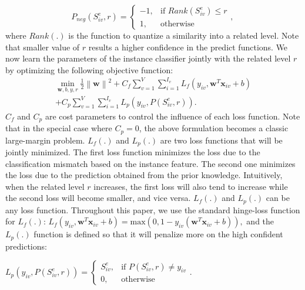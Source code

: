 \begin{equation}
\label{eq3}
P_{neg}(S_{iv}^{e},r) = 
\begin{cases}
-1,& \text{if } Rank(S_{iv}^{e}) \leq r \\
1,              & \text{otherwise}
\end{cases}\text{, }
\end{equation}
where $Rank(.)$ is the function to quantize a similarity into a related level. Note that smaller value of $r$ results a higher confidence in the predict functions. We now learn the parameters of the instance classifier jointly with the related level $r$ by optimizing the following objective function:
\label{method}
\begin{equation}
\label{eq4}
\begin{split}
\min_{\textbf{w},b,y,r} \frac{1}{2} \left \| \textbf{w} \right \|^{2} + C_{f} \sum_{v=1}^{V}\sum_{i=1}^{I_{v}}L_{f}\left ( y_{iv}, \textbf{w}^{T}\textbf{x}_{iv}+b \right ) \\
+ C_{p} \sum_{v=1}^{V}\sum_{i=1}^{I_{v}}L_{p}\left ( y_{iv}, P(S_{iv}^{e},r) \right ).
\end{split}
\end{equation}
$C_{f}$ and $C_{p}$ are cost parameters to control the influence of each loss function. Note that in the special case where $C_{p}=0$, the above formulation becomes a classic large-margin problem. $L_{f}(.)$ and $L_{p}(.)$ are two loss functions that will be jointly minimized. The first loss function minimizes the loss due to the classification mismatch based on the instance feature. The second one minimizes the loss due to the prediction obtained from the prior knowledge. Intuitively, when the related level $r$ increases, the first loss will also tend to increase while the second loss will become smaller, and vice versa. $L_{f}(.)$ and $L_{p}(.)$ can be any loss function. Throughout this paper, we use the standard hinge-loss function for $L_{f}(.)$:
$L_{f}\left ( y_{iv},\textbf{w}^{T}\textbf{x}_{iv}+b \right )=\text{max}(0,1-y_{iv}(\textbf{w}^{T}\textbf{x}_{iv}+b)),$
and the $L_{p}(.)$ function is defined so that it will penalize more on the high confident predictions:

$L_{p}\left ( y_{iv}, P(S_{iv}^{e},r) \right )= 
\begin{cases}
S_{iv}^{e},& \text{if } P(S_{iv}^{e},r) \neq y_{iv} \\
0,              & \text{otherwise}
\end{cases}.$

